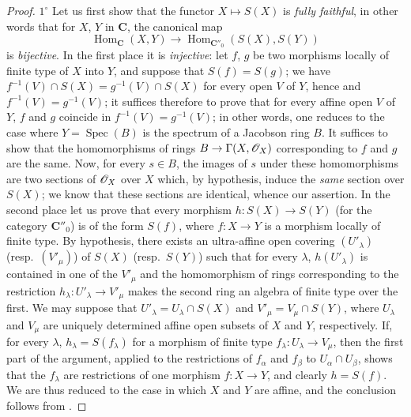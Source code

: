 \begin{proof}
$1^\circ$ Let us first show that the functor $X\mapsto S(X)$ is \emph{fully faithful}, in other words that for $X$, $Y$ in $\mathbf{C}$, the canonical map
\[
  \operatorname{Hom}_{\mathbf{C}}(X,Y)\to\operatorname{Hom}_{\mathbf{C}''_0}(S(X),S(Y))
\]
is \emph{bijective}.
In the first place it is \emph{injective}: let $f$, $g$ be two morphisms locally of finite type of $X$ into $Y$, and suppose that $S(f)=S(g)$; we have $f^{-1}(V)\cap S(X)=g^{-1}(V)\cap S(X)$ for every open $V$ of $Y$, hence  and  $f^{-1}(V)=g^{-1}(V)$; it suffices therefore to prove that for every affine open $V$ of $Y$, $f$ and $g$ coincide in $f^{-1}(V)=g^{-1}(V)$; in other words, one reduces to the case where $Y=\operatorname{Spec}(B)$ is the spectrum of a Jacobson ring $B$.
It suffices  to show that the homomorphisms of rings $B\to\Gamma(X,\mathscr{O}_X)$ corresponding to $f$ and $g$ are the same.
Now, for every $s\in B$, the images of $s$ under these homomorphisms are two sections of $\mathscr{O}_X$ over $X$ which, by hypothesis, induce the \emph{same} section over $S(X)$; we know  that these sections are identical, whence our assertion.
In the second place let us prove that every morphism $h:S(X)\to S(Y)$ (for the category $\mathbf{C}''_0$) is of the form $S(f)$, where $f:X\to Y$ is a morphism locally of finite type.
By hypothesis, there exists an ultra-affine open covering $(U'_\lambda)$ (resp.\ $(V'_\mu)$) of $S(X)$ (resp.\ $S(Y)$) such that for every $\lambda$, $h(U'_\lambda)$ is contained in one of the $V'_\mu$ and the homomorphism of rings corresponding to the restriction $h_\lambda:U'_\lambda\to V'_\mu$ makes the second ring an algebra of finite type over the first.
We may suppose that $U'_\lambda=U_\lambda\cap S(X)$ and $V'_\mu=V_\mu\cap S(Y)$, where $U_\lambda$ and $V_\mu$ are uniquely determined affine open subsets of $X$ and $Y$, respectively. If, for every $\lambda$, $h_\lambda=S(f_\lambda)$ for a morphism of finite type $f_\lambda:U_\lambda\to V_\mu$, then the first part of the argument, applied to the restrictions of $f_\alpha$ and $f_\beta$ to $U_\alpha\cap U_\beta$, shows that the $f_\lambda$ are restrictions of one morphism $f:X\to Y$, and clearly $h=S(f)$. We are thus reduced to the case in which $X$ and $Y$ are affine, and the conclusion follows from .


\end{proof}
